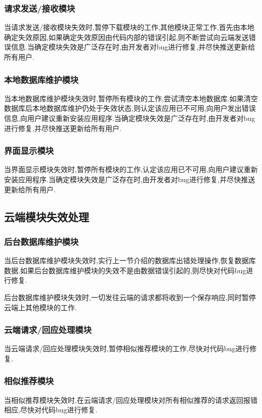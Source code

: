 \subsubsection{请求发送/接收模块}

当请求发送/接收模块失效时,暂停下载模块的工作,其他模块正常工作,首先由本地确定失效原因,如果确定失效原因由代码内部的错误引起,则不断尝试向云端发送错误信息.当确定模块失效是广泛存在时,由开发者对bug进行修复,并尽快推送更新给所有用户.

\subsubsection{本地数据库维护模块}

当本地数据库维护模块失效时,暂停所有模块的工作,尝试清空本地数据库.如果清空数据库后本地数据库维护仍处于失效状态,则认定该应用已不可用,向用户发出错误信息,向用户建议重新安装应用程序.当确定模块失效是广泛存在时,由开发者对bug进行修复,并尽快推送更新给所有用户.

\subsubsection{界面显示模块}

当界面显示模块失效时,暂停所有模块的工作,认定该应用已不可用,向用户建议重新安装应用程序.当确定模块失效是广泛存在时,由开发者对bug进行修复,并尽快推送更新给所有用户.

\subsection{云端模块失效处理}

\subsubsection{后台数据库维护模块}

当后台数据库维护模块失效时,实行上一节介绍的数据库出错处理操作,恢复数据库数据.如果后台数据库维护模块的失效不是由数据错误引起的,则尽快对代码bug进行修复.

后台数据库维护模块失效时,一切发往云端的请求都将收到一个保存响应,同时暂停云端上其他模块的工作.

\subsubsection{云端请求/回应处理模块}

当云端请求/回应处理模块失效时,暂停相似推荐模块的工作,尽快对代码bug进行修复.

\subsubsection{相似推荐模块}

当相似推荐模块失效时,在云端请求/回应处理模块对所有相似推荐的请求返回报错相应,尽快对代码bug进行修复.

